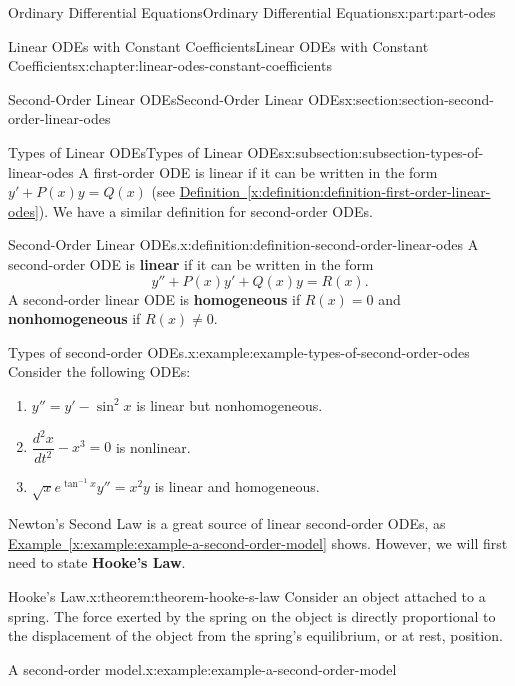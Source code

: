 \documentclass[twoside,10pt,]{book}
\newcommand{\xreffont}{\relax}
\newcommand{\terminology}[1]{\textbf{#1}}
\numberwithin{equation}{part}
\providecommand{\dv}[3][]{\dfrac{d^{#1} #2}{d #3^{#1}}}
\begin{document}
\begin{partptx}{Ordinary Differential Equations}{}{Ordinary Differential Equations}{}{}{x:part:part-odes}
\begin{chapterptx}{Linear ODEs with Constant Coefficients}{}{Linear ODEs with Constant Coefficients}{}{}{x:chapter:linear-odes-constant-coefficients}
\begin{sectionptx}{Second-Order Linear ODEs}{}{Second-Order Linear ODEs}{}{}{x:section:section-second-order-linear-odes}
\begin{introduction}{}
\end{introduction}%
%
%
\typeout{************************************************}
\typeout{************************************************}
%
\begin{subsectionptx}{Types of Linear ODEs}{}{Types of Linear ODEs}{}{}{x:subsection:subsection-types-of-linear-odes}
A first-order ODE is linear if it can be written in the form \(y'+P(x)y = Q(x)\) (see \hyperref[x:definition:definition-first-order-linear-odes]{Definition~{\xreffont\ref{x:definition:definition-first-order-linear-odes}}}). We have a similar definition for second-order ODEs.%
\begin{definition}{Second-Order Linear ODEs.}{x:definition:definition-second-order-linear-odes}%
%
A second-order ODE is \terminology{linear} if it can be written in the form%
\begin{equation*}
y''+P(x)y'+Q(x)y = R(x).
\end{equation*}
A second-order linear ODE is \terminology{homogeneous} if \(R(x) = 0\) and \terminology{nonhomogeneous} if \(R(x)\neq0\).%
\end{definition}
\begin{example}{Types of second-order ODEs.}{x:example:example-types-of-second-order-odes}%
Consider the following ODEs:%
\begin{enumerate}
\item{}\(y'' = y' - \sin^{2}x\) is linear but nonhomogeneous.%
\item{}\(\dv[2]{x}{t} - x^{3} = 0\) is nonlinear.%
\item{}\(\sqrt{x}e^{\tan^{-1}x}y'' = x^{2}y\) is linear and homogeneous.%
\end{enumerate}
%
\end{example}
Newton's Second Law is a great source of linear second-order ODEs, as \hyperref[x:example:example-a-second-order-model]{Example~{\xreffont\ref{x:example:example-a-second-order-model}}} shows. However, we will first need to state \terminology{Hooke's Law}.%
\begin{theorem}{Hooke's Law.}{}{x:theorem:theorem-hooke-s-law}%
%
Consider an object attached to a spring. The force exerted by the spring on the object is directly proportional to the displacement of the object from the spring's equilibrium, or at rest, position.%
\end{theorem}
\begin{example}{A second-order model.}{x:example:example-a-second-order-model}%

\end{example}
\end{subsectionptx}
\end{sectionptx}
\end{chapterptx}
\end{partptx}
\end{document}
